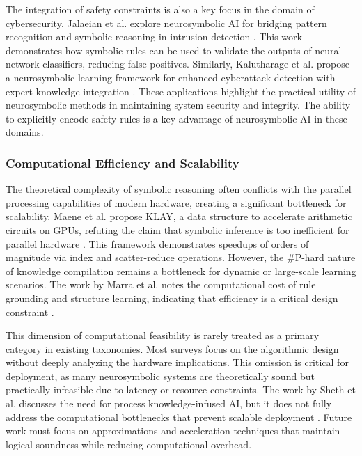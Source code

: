\documentclass{article}
\begin{document}
The integration of safety constraints is also a key focus in the domain of cybersecurity. Jalaeian et al. explore neurosymbolic AI for bridging pattern recognition and symbolic reasoning in intrusion detection \cite{jalaeian2023neurosymbolic}. This work demonstrates how symbolic rules can be used to validate the outputs of neural network classifiers, reducing false positives. Similarly, Kalutharage et al. propose a neurosymbolic learning framework for enhanced cyberattack detection with expert knowledge integration \cite{kalutharage2024neurosymbolic}. These applications highlight the practical utility of neurosymbolic methods in maintaining system security and integrity. The ability to explicitly encode safety rules is a key advantage of neurosymbolic AI in these domains.

\subsubsection{Computational Efficiency and Scalability}

\label{sec:computational_efficiency_and_scalability}

The theoretical complexity of symbolic reasoning often conflicts with the parallel processing capabilities of modern hardware, creating a significant bottleneck for scalability. Maene et al. propose KLAY, a data structure to accelerate arithmetic circuits on GPUs, refuting the claim that symbolic inference is too inefficient for parallel hardware \cite{maene2024klay}. This framework demonstrates speedups of orders of magnitude via index and scatter-reduce operations. However, the \#P-hard nature of knowledge compilation remains a bottleneck for dynamic or large-scale learning scenarios. The work by Marra et al. notes the computational cost of rule grounding and structure learning, indicating that efficiency is a critical design constraint \cite{marra2024statistical}.

This dimension of computational feasibility is rarely treated as a primary category in existing taxonomies. Most surveys focus on the algorithmic design without deeply analyzing the hardware implications. This omission is critical for deployment, as many neurosymbolic systems are theoretically sound but practically infeasible due to latency or resource constraints. The work by Sheth et al. discusses the need for process knowledge-infused AI, but it does not fully address the computational bottlenecks that prevent scalable deployment \cite{sheth2023neurosymbolic}. Future work must focus on approximations and acceleration techniques that maintain logical soundness while reducing computational overhead.
\end{document}

